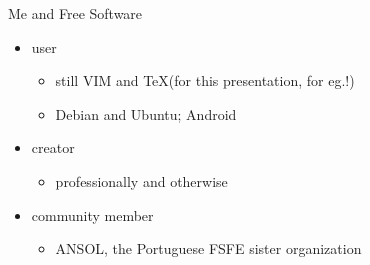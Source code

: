 \documentclass[landscape]{slides}
\begin{document}
\begin{slide}
Me and Free Software
  \begin{itemize}
    \item{} user
      \begin{itemize}
          \item{} still VIM and \TeX (for this presentation, for eg.!)
          \item{} Debian and Ubuntu; Android
      \end{itemize}
    \item{} creator
      \begin{itemize}
        \item{} professionally and otherwise
      \end{itemize}
    \item{} community member
      \begin{itemize}
        \item{} ANSOL, the Portuguese FSFE sister organization
      \end{itemize}
  \end{itemize}
\end{slide}



\begin{slide}
\end{slide}
\end{document}
